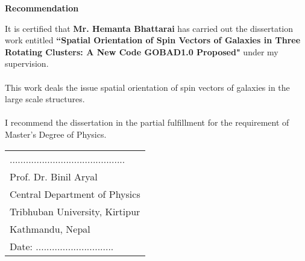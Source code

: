 \thispagestyle{plain}
\newpage
{}
\newpage
\thispagestyle{plain}
\begin{center} \large\bf {Recommendation}
\end{center}
\vspace{1cm} {It is certified that {\bf Mr. Hemanta Bhattarai} has
carried out the dissertation work entitled {\bf ``Spatial Orientation of Spin Vectors of Galaxies in Three Rotating Clusters: A New Code GOBAD1.0 Proposed" } under my supervision.
\\
\\
This work deals the issue 
spatial orientation of spin vectors of galaxies in the large scale
structures.
\\
\\
I recommend the dissertation in the partial fulfillment for the
requirement of Master's Degree of Physics.}\\

\vspace{2cm} \noindent
\begin{tabular}{l}
........................................... \\
Prof. Dr. Binil Aryal\\
Central Department of Physics\\
Tribhuban University, Kirtipur\\
Kathmandu, Nepal\\
\noalign{\bigskip}
Date: .............................\\
 \end{tabular}
